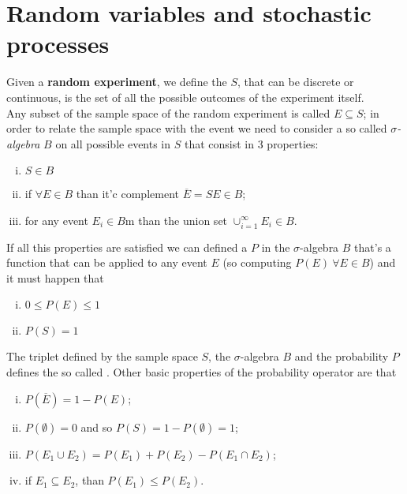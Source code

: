 \chapter{Random variables and stochastic processes}
	Given a \textbf{random experiment}, we define the  $S$, that can be discrete or continuous, is the set of all the possible outcomes of the experiment itself.\\
	Any subset of the sample space of the random experiment is called  $E \subseteq S$; in order to relate the sample space with the event we need to consider a so called $\sigma$\textit{-algebra} $B$ on all possible events in $S$ that consist in 3 properties:
	\begin{enumerate}[i)]
		\item $S\in B$ 
		\item if $\forall E \in B$ than it'c complement $\overline E = S E \in B$;
		\item for any event $E_i \in B$m than the union set $\cup_{i=1}^\infty E_i\in B$.
	\end{enumerate}
	
	If all this properties are satisfied we can defined a  $P$ in the $\sigma$-algebra $B$ that's a function that can be applied to any event $E$ (so computing $P(E) \ \forall E \in B$) and it must happen that
	\begin{enumerate}[i)]
		\item $0 \leq P(E) \leq 1$ 
		\item $P(S) = 1$
	\end{enumerate}

	The triplet defined by the sample space $S$, the $\sigma$-algebra $B$ and the probability $P$ defines  the so called . Other basic properties of the probability operator are that
	\begin{enumerate}[i)]
		\item $P(\overline E)= 1 - P(E)$;
		\item $P(\emptyset) = 0$ and so $P(S) = 1 - P(\emptyset) = 1$;
		\item $P(E_1 \cup E_2) = P(E_1) + P(E_2) - P(E_1 \cap E_2)$;
		\item if $E_1 \subseteq E_2$, than $P(E_1) \leq P(E_2)$.
	\end{enumerate}
	

